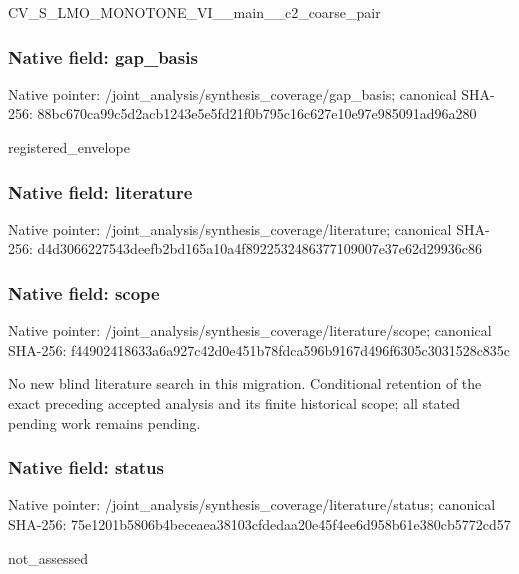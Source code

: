 \documentclass[10pt,a4paper]{article}
\begin{document}
\begingroup\raggedright\sloppy CV\_\allowbreak{}S\_\allowbreak{}LMO\_\allowbreak{}MONOTONE\_\allowbreak{}VI\_\allowbreak{}\_\allowbreak{}main\_\allowbreak{}\_\allowbreak{}c2\_\allowbreak{}coarse\_\allowbreak{}pair\par\endgroup

\subsubsection{Native field: gap\_\allowbreak{}basis}
Native pointer: /joint\_\allowbreak{}analysis/synthesis\_\allowbreak{}coverage/gap\_\allowbreak{}basis; canonical SHA-256: 88bc670ca99c5d2acb1243e5e5fd21f0b795c16c627e10e97e985091ad96a280

\begingroup\raggedright\sloppy registered\_\allowbreak{}envelope\par\endgroup

\subsubsection{Native field: literature}
Native pointer: /joint\_\allowbreak{}analysis/synthesis\_\allowbreak{}coverage/literature; canonical SHA-256: d4d3066227543deefb2bd165a10a4f8922532486377109007e37e62d29936c86

\subsubsection{Native field: scope}
Native pointer: /joint\_\allowbreak{}analysis/synthesis\_\allowbreak{}coverage/literature/scope; canonical SHA-256: f44902418633a6a927c42d0e451b78fdca596b9167d496f6305c3031528c835c

\begingroup\raggedright\sloppy No new blind literature search in this migration. Conditional retention of the exact preceding accepted analysis and its finite historical scope;\allowbreak{} all stated pending work remains pending.\par\endgroup

\subsubsection{Native field: status}
Native pointer: /joint\_\allowbreak{}analysis/synthesis\_\allowbreak{}coverage/literature/status; canonical SHA-256: 75e1201b5806b4beceaea38103cfdedaa20e45f4ee6d958b61e380cb5772cd57

\begingroup\raggedright\sloppy not\_\allowbreak{}assessed\par\endgroup
\end{document}
